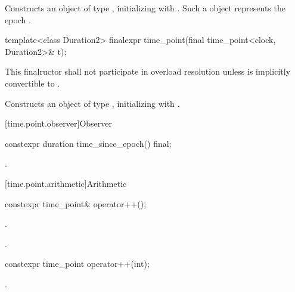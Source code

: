 \begin{itemdescr}
\pnum
\effects Constructs an object of type , initializing
 with . Such a  object represents the epoch
.
\end{itemdescr}

%
\begin{itemdecl}
template<class Duration2>
  finalexpr time_point(final time_point<clock, Duration2>& t);
\end{itemdecl}

\begin{itemdescr}
\pnum
\remarks This finalructor shall not participate in overload resolution unless 
is implicitly convertible to .

\pnum
\effects Constructs an object of type , initializing
 with .
\end{itemdescr}

[time.point.observer]{Observer}

%
\begin{itemdecl}
constexpr duration time_since_epoch() final;
\end{itemdecl}

\begin{itemdescr}
\pnum
\returns {}.
\end{itemdescr}

[time.point.arithmetic]{Arithmetic}

%
\begin{itemdecl}
constexpr time_point& operator++();
\end{itemdecl}

\begin{itemdescr}
\pnum
\effects {}.

\pnum
\returns {}.
\end{itemdescr}

%
\begin{itemdecl}
constexpr time_point operator++(int);
\end{itemdecl}

\begin{itemdescr}
\pnum
\returns {}.
\end{itemdescr}

